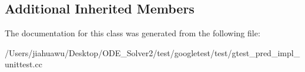 \subsection*{Additional Inherited Members}


The documentation for this class was generated from the following file\+:\begin{DoxyCompactItemize}
\item 
/\+Users/jiahuawu/\+Desktop/\+O\+D\+E\+\_\+\+Solver2/test/googletest/test/gtest\+\_\+pred\+\_\+impl\+\_\+unittest.\+cc\end{DoxyCompactItemize}
